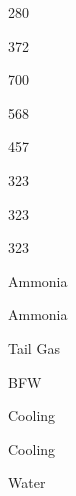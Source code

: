 \documentclass[a4paper,portrait,12pt]{article}
\begin{document}
280





372





700





568





457





323





323





323





\begin{flushleft}
Ammonia
\end{flushleft}





\begin{flushleft}
Ammonia
\end{flushleft}





\begin{flushleft}
Tail Gas
\end{flushleft}





\begin{flushleft}
BFW
\end{flushleft}





\begin{flushleft}
Cooling
\end{flushleft}





\begin{flushleft}
Cooling
\end{flushleft}





\begin{flushleft}
Water
\end{flushleft}
\end{document}
